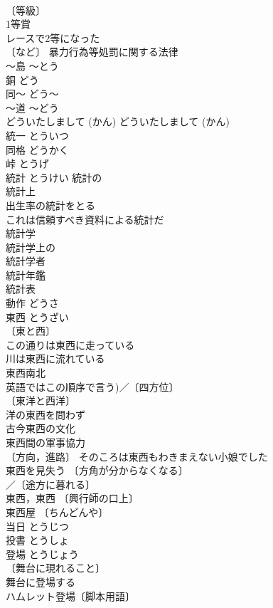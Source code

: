 \documentclass[8pt]{extreport}
\begin{document}
\begin{CJK}{UTF8}{min}
\\	〔等級〕
\\	1等賞 
\\	レースで2等になった 
\\	〔など〕 暴力行為等処罰に関する法律 
\\	～島	～とう	
\\	銅	どう	
\\	同～	どう～	
\\	～道	～どう	
\\	どういたしまして (かん)	どういたしまして (かん)	
\\	統一	とういつ	
\\	同格	どうかく	
\\	峠	とうげ	
\\	統計	とうけい	統計の 
\\	統計上 
\\	出生率の統計をとる 
\\	これは信頼すべき資料による統計だ 
\\	統計学 
\\	統計学上の 
\\	統計学者 
\\	統計年鑑 
\\	統計表 
\\	動作	どうさ	
\\	東西	とうざい	
\\	〔東と西〕
\\	この通りは東西に走っている 
\\	川は東西に流れている 
\\	東西南北 
\\	英語ではこの順序で言う)／〔四方位〕
\\	〔東洋と西洋〕
\\	洋の東西を問わず 
\\	古今東西の文化 
\\	東西間の軍事協力 
\\	〔方向，進路〕 そのころは東西もわきまえない小娘でした 
\\	東西を見失う 〔方角が分からなくなる〕
\\	／〔途方に暮れる〕
\\	東西，東西 〔興行師の口上〕
\\	東西屋 〔ちんどんや〕
\\	当日	とうじつ	
\\	投書	とうしょ	
\\	登場	とうじょう	
\\	〔舞台に現れること〕
\\	舞台に登場する 
\\	ハムレット登場〔脚本用語〕 

\end{CJK}
\end{document}
